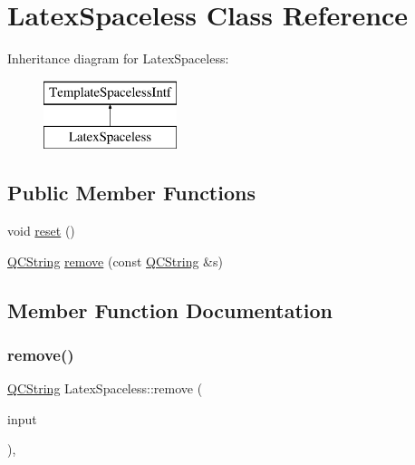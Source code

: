 \hypertarget{class_latex_spaceless}{}\section{Latex\+Spaceless Class Reference}
\label{class_latex_spaceless}
Inheritance diagram for Latex\+Spaceless\+:\begin{figure}[H]
\begin{center}
\leavevmode
\includegraphics[height=2.000000cm]{class_latex_spaceless}
\end{center}
\end{figure}
\subsection*{Public Member Functions}
\begin{DoxyCompactItemize}
\item 
void \mbox{\hyperlink{class_latex_spaceless_a75d5def745f89afcbf59a948de20c0db}{reset}} ()
\item 
\mbox{\hyperlink{class_q_c_string}{Q\+C\+String}} \mbox{\hyperlink{class_latex_spaceless_ac7d1401f8710dadab196b83be492b6ed}{remove}} (const \mbox{\hyperlink{class_q_c_string}{Q\+C\+String}} \&s)
\end{DoxyCompactItemize}


\subsection{Member Function Documentation}
\mbox{\label{class_latex_spaceless_ac7d1401f8710dadab196b83be492b6ed}} 
\subsubsection{\texorpdfstring{remove()}{remove()}}
{\footnotesize\ttfamily \mbox{\hyperlink{class_q_c_string}{Q\+C\+String}} Latex\+Spaceless\+::remove (\begin{DoxyParamCaption}\item[{const \mbox{\hyperlink{class_q_c_string}{Q\+C\+String}} \&}]{input }\end{DoxyParamCaption})\hspace{0.3cm}{\ttfamily [inline]}, {\ttfamily [virtual]}}

